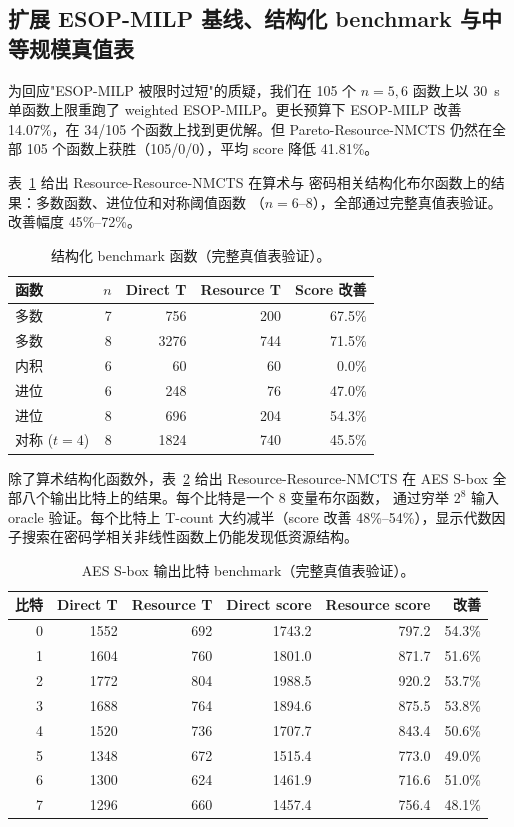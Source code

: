 \documentclass[UTF8,fontset=fandol,11pt]{ctexart}
\newcommand{\method}{Resource-NMCTS}
\begin{document}
\subsection{扩展 ESOP-MILP 基线、结构化 benchmark 与中等规模真值表}
\label{sec:extended-results-zh}

为回应"ESOP-MILP 被限时过短"的质疑，我们在 105 个 $n=5,6$ 函数上以
30~s 单函数上限重跑了 weighted ESOP-MILP。更长预算下 ESOP-MILP 改善
14.07\%，在 34/105 个函数上找到更优解。但 Pareto-\method{} 仍然在全部
105 个函数上获胜（105/0/0），平均 score 降低 41.81\%。

表~\ref{tab:structured-benchmark-zh} 给出 Resource-\method{} 在算术与
密码相关结构化布尔函数上的结果：多数函数、进位位和对称阈值函数
（$n=6$--$8$），全部通过完整真值表验证。改善幅度 45\%--72\%。

\begin{table}[H]
\centering\small
\caption{结构化 benchmark 函数（完整真值表验证）。}
\label{tab:structured-benchmark-zh}
\begin{tabular}{lrrrr}\toprule
函数 & $n$ & Direct T & Resource T & Score 改善 \\ \midrule
多数 & 7 & 756 & 200 & 67.5\% \\
多数 & 8 & 3276 & 744 & 71.5\% \\
内积 & 6 & 60 & 60 & 0.0\% \\
进位 & 6 & 248 & 76 & 47.0\% \\
进位 & 8 & 696 & 204 & 54.3\% \\
对称 ($t{=}4$) & 8 & 1824 & 740 & 45.5\% \\ \bottomrule
\end{tabular}\end{table}

除了算术结构化函数外，表~\ref{tab:aes-sbox-zh} 给出 Resource-\method{}
在 AES S-box 全部八个输出比特上的结果。每个比特是一个 8 变量布尔函数，
通过穷举 $2^8$ 输入 oracle 验证。每个比特上 T-count 大约减半（score 改善
48\%--54\%），显示代数因子搜索在密码学相关非线性函数上仍能发现低资源结构。

\begin{table}[H]
\centering\small
\caption{AES S-box 输出比特 benchmark（完整真值表验证）。}
\label{tab:aes-sbox-zh}
\begin{tabular}{rrrrrr}
\toprule
比特 & Direct T & Resource T & Direct score & Resource score & 改善 \\
\midrule
0 & 1552 & 692 & 1743.2 & 797.2 & 54.3\% \\
1 & 1604 & 760 & 1801.0 & 871.7 & 51.6\% \\
2 & 1772 & 804 & 1988.5 & 920.2 & 53.7\% \\
3 & 1688 & 764 & 1894.6 & 875.5 & 53.8\% \\
4 & 1520 & 736 & 1707.7 & 843.4 & 50.6\% \\
5 & 1348 & 672 & 1515.4 & 773.0 & 49.0\% \\
6 & 1300 & 624 & 1461.9 & 716.6 & 51.0\% \\
7 & 1296 & 660 & 1457.4 & 756.4 & 48.1\% \\
\bottomrule
\end{tabular}
\end{table}
\end{document}
